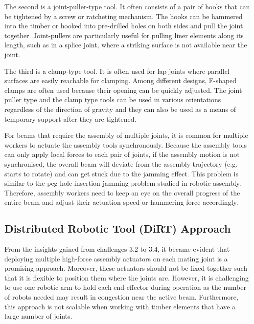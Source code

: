 The second is a joint-puller-type tool. It often consists of a pair of hooks that can be tightened by a screw or ratcheting mechanism. The hooks can be hammered into the timber or hooked into pre-drilled holes on both sides and pull the joint together. Joint-pullers are particularly useful for pulling liner elements along its length, such as in a splice joint, where a striking surface is not available near the joint.

The third is a clamp-type tool. It is often used for lap joints where parallel surfaces are easily reachable for clamping. Among different designs, F-shaped clamps are often used because their opening can be quickly adjusted. The joint puller type and the clamp type tools can be used in various orientations regardless of the direction of gravity and they can also be used as a means of temporary support after they are tightened.

For beams that require the assembly of multiple joints, it is common for multiple workers to actuate the assembly tools synchronously. Because the assembly tools can only apply local forces to each pair of joints, if the assembly motion is not synchronised, the overall beam will deviate from the assembly trajectory (e.g. starts to rotate) and can get stuck due to the jamming effect. This problem is similar to the peg-hole insertion jamming problem studied in robotic assembly. \parencite{dupontJammingWedgingConstrained1994} Therefore, assembly workers need to keep an eye on the overall progress of the entire beam and adjust their actuation speed or hammering force accordingly.

\subsection{Distributed Robotic Tool (DiRT) Approach}
\label{subsection:exploration-1-distributed-robotic-tool-approach}

From the insights gained from challenges 3.2 to 3.4, it became evident that deploying multiple high-force assembly actuators on each mating joint is a promising approach. Moreover, these actuators should not be fixed together such that it is flexible to position them where the joints are. However, it is challenging to use one robotic arm to hold each end-effector during operation as the number of robots needed may result in congestion near the active beam. Furthermore, this approach is not scalable when working with timber elements that have a large number of joints.

